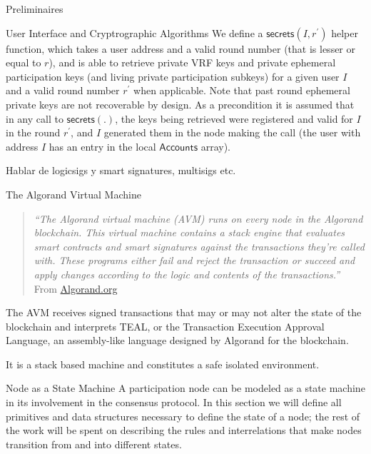 \documentclass[10pt,a4paper]{article}
\begin{document}
\begin{section}{Preliminaires}
\begin{subsection}{User Interface and Cryptrographic Algorithms}
    We define a $\mathsf{secrets}(I, r^\prime)$ helper function, which takes a user address and
    a valid round number (that is lesser or equal to $r$), and is able to retrieve private VRF keys
    and private ephemeral participation keys (and living private participation subkeys) for a given user $I$ 
    and a valid round number $r^\prime$ when applicable. Note that past round ephemeral private keys are not recoverable
    by design. 
    As a precondition it is assumed that in any call to $\mathsf{secrets(.)}$,
    the keys being retrieved were registered and valid for $I$ in the round $r^\prime$, and $I$ generated them
    in the node making the call (the user with address $I$ has an entry in the local $\mathsf{Accounts}$ array).


    Hablar de logicsigs y smart signatures, multisigs etc.

\end{subsection}
\begin{subsection}{The Algorand Virtual Machine}\label{sect:avm}
    
    \begin{quote} 
        {\em``The Algorand virtual machine (AVM) runs on every node in the Algorand blockchain. 
    This virtual machine contains a stack engine that evaluates smart contracts and smart 
    signatures against the transactions they're called with. These programs either fail 
    and reject the transaction or succeed and apply changes according to the logic and 
    contents of the transactions.''} From \href{https://developer.algorand.org/docs/get-details/dapps/avm/}{Algorand.org}
    \end{quote}
    
The AVM receives signed transactions that may or may not alter the 
state of the blockchain and interprets TEAL, or the Transaction Execution 
Approval Language, an assembly-like language designed by Algorand 
for the blockchain.

It is a stack based machine and constitutes a safe isolated environment.

\end{subsection}
\begin{subsection}{Node as a State Machine}
A participation node can be modeled as a state machine in its involvement in the consensus 
protocol.
In this section we will define all primitives and data structures necessary to define the state
of a node; the rest of the work will be spent on describing the rules and interrelations that
make nodes transition from and into different states.


\end{subsection}
\end{section}
\end{document}
